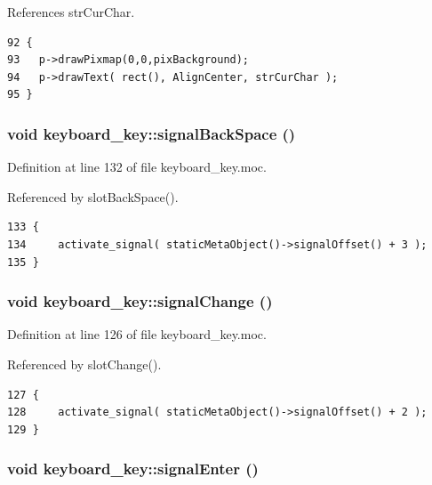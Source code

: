 References str\-Cur\-Char.



\footnotesize\begin{verbatim}92 {
93   p->drawPixmap(0,0,pixBackground);
94   p->drawText( rect(), AlignCenter, strCurChar );
95 }
\end{verbatim}\normalsize 
{}
\subsubsection{\setlength{\rightskip}{0pt plus 5cm}void keyboard\_\-key::signal\-Back\-Space ()\hspace{0.3cm}{\tt  [signal]}}\label{classkeyboard__key_keyboard__keyl3}




Definition at line 132 of file keyboard\_\-key.moc.

Referenced by slot\-Back\-Space().



\footnotesize\begin{verbatim}133 {
134     activate_signal( staticMetaObject()->signalOffset() + 3 );
135 }
\end{verbatim}\normalsize 
{}
\subsubsection{\setlength{\rightskip}{0pt plus 5cm}void keyboard\_\-key::signal\-Change ()\hspace{0.3cm}{\tt  [signal]}}\label{classkeyboard__key_keyboard__keyl2}




Definition at line 126 of file keyboard\_\-key.moc.

Referenced by slot\-Change().



\footnotesize\begin{verbatim}127 {
128     activate_signal( staticMetaObject()->signalOffset() + 2 );
129 }
\end{verbatim}\normalsize 
{}
\subsubsection{\setlength{\rightskip}{0pt plus 5cm}void keyboard\_\-key::signal\-Enter ()\hspace{0.3cm}{\tt  [signal]}}\label{classkeyboard__key_keyboard__keyl1}




